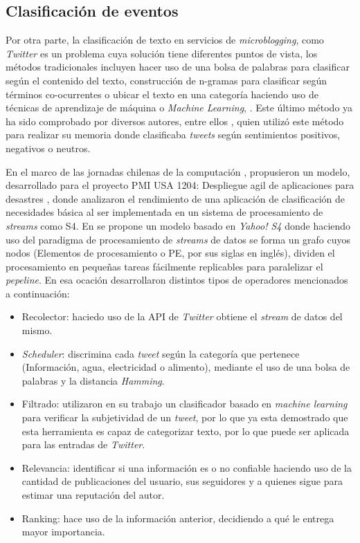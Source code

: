 \subsection{Clasificación de eventos}
\label{intro:ea:clasificacion}

Por otra parte, la clasificación de texto en servicios de \textit{microblogging}, como \textit{Twitter} es un problema cuya solución tiene diferentes puntos de vista, los métodos tradicionales incluyen hacer uso de una bolsa de palabras para clasificar según el contenido del texto, construcción de n-gramas para clasificar según términos co-ocurrentes o ubicar el texto en una categoría haciendo uso de técnicas de aprendizaje de máquina o \textit{Machine Learning}, \cite{EventDetection}. 
Este último método ya ha sido comprobado por diversos autores, entre ellos \cite{Maldonado}, quien utilizó este método para realizar su memoria donde clasificaba \textit{tweets} según sentimientos positivos, negativos o neutros. 

En el marco de las jornadas chilenas de la computación \cite{WladdimiroPMI}, propusieron un modelo, desarrollado para el proyecto PMI USA 1204: Despliegue agil de aplicaciones para desastres \cite{PMIProfes}, donde analizaron el rendimiento de una aplicación de clasificación de necesidades básica al ser implementada en un sistema de procesamiento de \textit{streams} como S4. En se propone un modelo basado en \textit{Yahoo! S4} donde haciendo uso del paradigma de procesamiento de \textit{streams} de datos se forma un grafo cuyos nodos (Elementos de procesamiento o PE, por sus siglas en inglés), dividen el procesamiento en pequeñas tareas fácilmente replicables para paralelizar el \textit{pepeline}. En esa ocación desarrollaron distintos tipos de operadores mencionados a continuación:

\begin{itemize}
\item Recolector: haciedo uso de la API de \textit{Twitter} obtiene el \textit{stream} de datos del mismo. 
\item \textit{Scheduler}: discrimina cada \textit{tweet} según la categoría que pertenece (Información, agua, electricidad o alimento), mediante el uso de una bolsa de palabras y la distancia \textit{Hamming}.
\item Filtrado: utilizaron en su trabajo un clasificador basado en \textit{machine learning} para verificar la subjetividad de un \textit{tweet}, por lo que ya esta demostrado que esta herramienta es capaz de categorizar texto, por lo que puede ser aplicada para las entradas de \textit{Twitter}.
\item Relevancia: identificar si una información es o no confiable haciendo uso de la cantidad de publicaciones del usuario, sus seguidores y a quienes sigue para estimar una reputación del autor.
\item Ranking: hace uso de la información anterior, decidiendo a qué le entrega mayor importancia.
\end{itemize}

